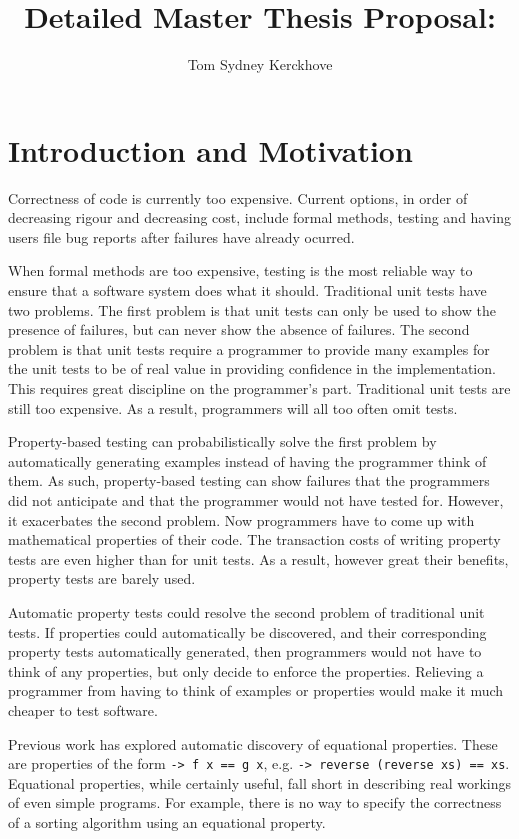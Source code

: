 \documentclass[a4paper, 11pt, onepage]{article}
\title{Detailed Master Thesis Proposal:\\\vspace{0.5cm}{\Huge Functional Property Discovery and Corresponding Test Generation in Haskell}}
\author{Tom Sydney Kerckhove}
\begin{document}
\maketitle

\section{Introduction and Motivation}


Correctness of code is currently too expensive.
Current options, in order of decreasing rigour and decreasing cost, include formal methods, testing and having users file bug reports after failures have already ocurred.

When formal methods are too expensive, testing is the most reliable way to ensure that a software system does what it should.
Traditional unit tests have two problems.
The first problem is that unit tests can only be used to show the presence of failures, but can never show the absence of failures.
The second problem is that unit tests require a programmer to provide many examples for the unit tests to be of real value in providing confidence in the implementation.
This requires great discipline on the programmer's part.
Traditional unit tests are still too expensive.
As a result, programmers will all too often omit tests.

Property-based testing \cite{QuickCheck} can probabilistically solve the first problem by automatically generating examples instead of having the programmer think of them.
As such, property-based testing can show failures that the programmers did not anticipate and that the programmer would not have tested for.
However, it exacerbates the second problem.
Now programmers have to come up with mathematical properties of their code.
The transaction costs of writing property tests are even higher than for unit tests.
As a result, however great their benefits, property tests are barely used.

Automatic property tests could resolve the second problem of traditional unit tests.
If properties could automatically be discovered, and their corresponding property tests automatically generated, then programmers would not have to think of any properties, but only decide to enforce the properties.
Relieving a programmer from having to think of examples or properties would make it much cheaper to test software.

Previous work \cite{QuickSpec} has explored automatic discovery of equational properties.
These are properties of the form \texttt{\x -> f x == g x}, e.g. \texttt{\xs -> reverse (reverse xs) == xs}.
Equational properties, while certainly useful, fall short in describing real workings of even simple programs.
For example, there is no way to specify the correctness of a sorting algorithm using an equational property.
\end{document}
